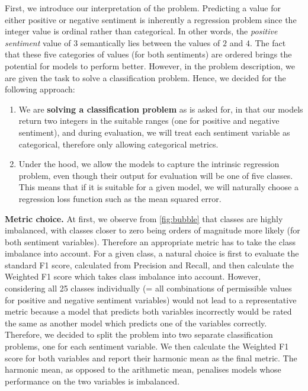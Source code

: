 First, we introduce our interpretation of the problem. Predicting a value for either positive or negative sentiment is inherently a regression problem since the integer value is ordinal rather than categorical. In other words, the \textit{positive sentiment} value of $3$ semantically lies between the values of $2$ and $4$. The fact that these five categories of values (for both sentiments) are ordered brings the potential for models to perform better. However, in the problem description, we are given the task to solve a classification problem. Hence, we decided for the following approach:
\begin{enumerate}
    \item We are \textbf{solving a classification problem} as is asked for, in that our models return two integers in the suitable ranges (one for positive and negative sentiment), and during evaluation, we will treat each sentiment variable as categorical, therefore only allowing categorical metrics.
    \item Under the hood, we allow the models to capture the intrinsic regression problem, even though their output for evaluation will be one of five classes. This means that if it is suitable for a given model, we will naturally choose a regression loss function such as the mean squared error.
\end{enumerate}

\textbf{Metric choice.}
At first, we observe from \cref{fig:bubble} that classes are highly imbalanced, with classes closer to zero being orders of magnitude more likely (for both sentiment variables). Therefore an appropriate metric has to take the class imbalance into account. For a given class, a natural choice is first to evaluate the standard F1 score, calculated from Precision and Recall, and then calculate the Weighted F1 score which takes class imbalance into account. However, considering all 25 classes individually (= all combinations of permissible values for positive and negative sentiment variables) would not lead to a representative metric because a model that predicts both variables incorrectly would be rated the same as another model which predicts one of the variables correctly. Therefore, we decided to split the problem into two separate classification problems, one for each sentiment variable. We then calculate the Weighted F1 score for both variables and report their harmonic mean as the final metric. The harmonic mean, as opposed to the arithmetic mean, penalises models whose performance on the two variables is imbalanced.

